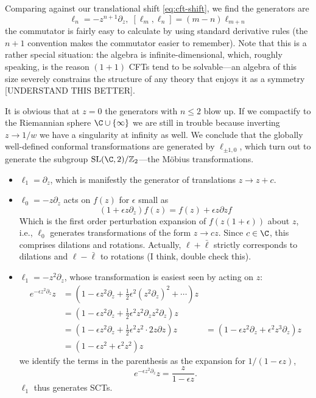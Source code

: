 \documentclass{report}
\begin{document}
 Comparing against our
translational shift \cref{eq:cft-shift}, we find the generators are 
\begin{equation*}
	\ell_n = -z^{n+1} \partial_z, \; \left[\ell_m, \ell_n\right] = (m-n)\ell_{m+n}
\end{equation*}
the commutator is fairly easy to calculate by using standard derivative rules
(the $ n+1 $ convention makes the commutator easier to remember).
Note that this is a rather special situation: the algebra is infinite-dimensional, 
which, roughly speaking, is the reason $ (1+1) $ CFTs tend to be solvable---an 
algebra of this size severely constrains the structure of any theory that enjoys it 
as a symmetry {\color{myred}[UNDERSTAND THIS BETTER]}.

It is obvious that at $ z=0 $ the generators with $ n\leq 2 $ blow up. 
If we compactify to the Riemannian sphere $ \C \cup \left\{\infty\right\} $
we are still in trouble because inverting $ z \rightarrow 1/w $ we have a 
singularity at infinity as well. We conclude that the globally well-defined 
conformal transformations are generated by $ \ell_{\pm 1,0} $, which turn 
out to generate the subgroup $ \text{SL}(\C, 2)/\mathbb{Z}_2 $---the M\"obius 
transformations. 
\begin{itemize}[nosep]
\item $ \ell_1 = \partial_z$, which is manifestly the generator of translations 
	$ z \rightarrow z+c $. 
\item $ \ell_0 =-z\partial_z $ acts on $ f(z) $ for $ \epsilon $ small as 
	\begin{equation*}
		(1+\epsilon z \partial_z)f(z) = f(z) + \epsilon z \partial z f
	\end{equation*}
	Which is the first order perturbation expansion of $ f(z(1+\epsilon)) $ about 
	$ z $, i.e., $ \ell_0 $ generates transformations of the form $ z
	\rightarrow c z $. Since $ c\in \C $, this comprises dilations and rotations. 
	Actually, $ \ell + \bar{\ell} $ strictly corresponds to dilations and 
	$ \ell - \bar{\ell} $ to rotations (I think, double check this). 
\item $ \ell_1 = -z^2 \partial_z $, whose transformation is easiest seen by 
	acting on $ z $: 
	\begin{align*}
		e^{-\epsilon z^2 \partial_z} z 
			&= (1-\epsilon z^2 \partial_z + \tfrac{1}{2} \epsilon^2 (z^2 \partial_z)^2
				+ \cdots) z \\ 
			&= (1-\epsilon z^2 \partial_z + \tfrac{1}{2} \epsilon^2 z^2 \partial_z z^2 \partial_z) z \\
			&= (1-\epsilon z^2 \partial_z + \tfrac{1}{2} \epsilon^2 z^2 \cdot 2 z \partial z)z 
			&= (1-\epsilon z^2 \partial_z + \epsilon^2 z^3 \partial_z)z\\ 
			&= (1-\epsilon z^2 + \epsilon^2 z^2 ) z
	\end{align*}
	we identify the terms in the parenthesis as the expansion for $ 1/(1-\epsilon z) $, 
	\begin{equation*}
		e^{-\epsilon z^2 \partial_z} z 
			= \frac{z}{1-\epsilon z}.
	\end{equation*}
	$ \ell_1 $ thus generates SCTs.
\end{itemize}
\end{document}
